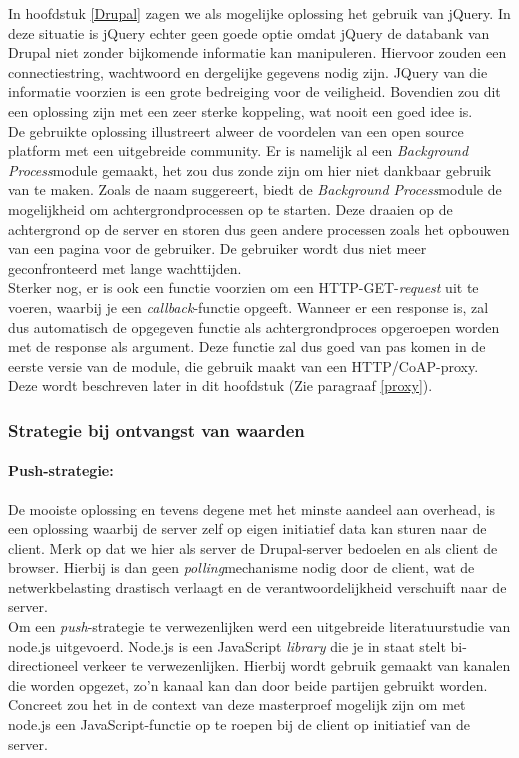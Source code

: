In hoofdstuk \ref{Drupal} zagen we als mogelijke oplossing het gebruik van jQuery. In deze situatie is jQuery echter geen goede optie omdat jQuery de databank van Drupal niet zonder bijkomende informatie kan manipuleren. Hiervoor zouden een connectiestring, wachtwoord en dergelijke gegevens nodig zijn. JQuery van die informatie voorzien is een grote bedreiging voor de veiligheid. Bovendien zou dit een oplossing zijn met een zeer sterke koppeling, wat nooit een goed idee is.\\
De gebruikte oplossing illustreert alweer de voordelen van een open source platform met een uitgebreide community. Er is namelijk al een \textit{Background Process}module gemaakt, het zou dus zonde zijn om hier niet dankbaar gebruik van te maken. Zoals de naam suggereert, biedt de \textit{Background Process}module de mogelijkheid om achtergrondprocessen op te starten. Deze draaien op de achtergrond op de server en storen dus geen andere processen zoals het opbouwen van een pagina voor de gebruiker. De gebruiker wordt dus niet meer geconfronteerd met lange wachttijden.\\
Sterker nog, er is ook een functie voorzien om een HTTP-GET-\textit{request} uit te voeren, waarbij je een \textit{callback}-functie opgeeft. Wanneer er een response is, zal dus automatisch de opgegeven functie als achtergrondproces opgeroepen worden met de response als argument. Deze functie zal dus goed van pas komen in de eerste versie van de module, die gebruik maakt van een HTTP/CoAP-proxy. Deze wordt beschreven later in dit hoofdstuk (Zie paragraaf \ref{proxy}).

\subsubsection{Strategie bij ontvangst van waarden}
\paragraph{Push-strategie:}

De mooiste oplossing en tevens degene met het minste aandeel aan overhead, is een oplossing waarbij de server zelf op eigen initiatief data kan sturen naar de client. Merk op dat we hier als server de Drupal-server bedoelen en als client de browser. Hierbij is dan geen \textit{polling}mechanisme nodig door de client, wat de netwerkbelasting drastisch verlaagt en de verantwoordelijkheid verschuift naar de server.\\
Om een \textit{push}-strategie te verwezenlijken werd een uitgebreide literatuurstudie van node.js uitgevoerd. Node.js is een JavaScript \textit{library} die je in staat stelt bi-directioneel verkeer te verwezenlijken. Hierbij wordt gebruik gemaakt van kanalen die worden opgezet, zo'n kanaal kan dan door beide partijen gebruikt worden.\\
Concreet zou het in de context van deze masterproef mogelijk zijn om met node.js een JavaScript-functie op te roepen bij de client op initiatief van de server.\\

